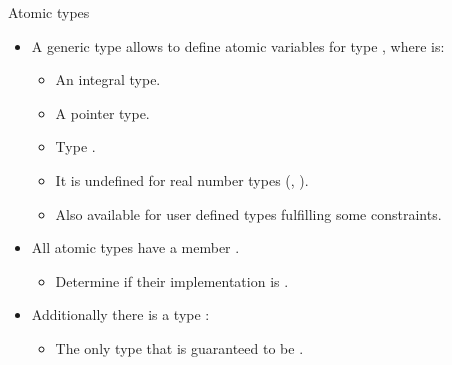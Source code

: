 \begin{frame}[t]{Atomic types}
\begin{itemize}
  \item A generic type  allows to define atomic variables for type , where  is:
    \begin{itemize}
      \item An integral type.
      \item A pointer type.
      \item Type .
      \item It is undefined for real number types (, ).
      \item Also available for user defined types fulfilling some constraints.
    \end{itemize}

  \item All atomic types have a member .
    \begin{itemize}
      \item Determine if their implementation is .
    \end{itemize}

  \item Additionally there is a type :
    \begin{itemize}
      \item The only type that is guaranteed to be .
    \end{itemize}
\end{itemize}
\end{frame}

